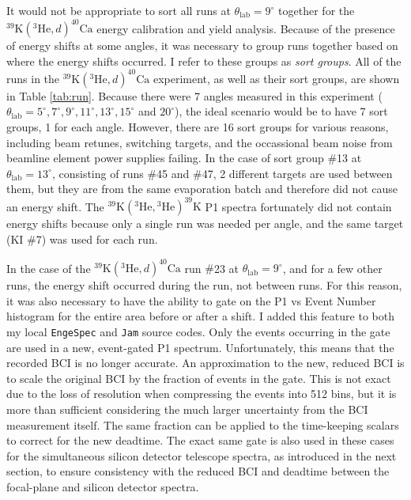 It would not be appropriate to sort all runs at $\theta_{\mathrm{lab}} = 9^{\circ}$ together for the $^{39}\mathrm{K}(^{3}\mathrm{He},d)^{40}\mathrm{Ca}$ energy calibration and yield analysis. Because of the presence of energy shifts at some angles, it was necessary to group runs together based on where the energy shifts occurred. I refer to these groups as \emph{sort groups}. All of the runs in the $^{39}\mathrm{K}(^{3}\mathrm{He},d)^{40}\mathrm{Ca}$ experiment, as well as their sort groups, are shown in Table \ref{tab:run}. Because there were 7 angles measured in this experiment ($\theta_{\mathrm{lab}} = 5^{\circ}, 7^{\circ}, 9^{\circ}, 11^{\circ}, 13^{\circ}, 15^{\circ}$ and $20^{\circ}$), the ideal scenario would be to have 7 sort groups, 1 for each angle. However, there are 16 sort groups for various reasons, including beam retunes, switching targets, and the occassional beam noise from beamline element power supplies failing. In the case of sort group $\#$13 at $\theta_{\mathrm{lab}} = 13^{\circ}$, consisting of runs $\#$45 and $\#$47, 2 different targets are used between them, but they are from the same evaporation batch and therefore did not cause an energy shift. The $^{39}\mathrm{K}(^{3}\mathrm{He}, {}^{3}\mathrm{He})^{39}\mathrm{K}$ P1 spectra fortunately did not contain energy shifts because only a single run was needed per angle, and the same target (KI $\#$7) was used for each run.

In the case of the $^{39}\mathrm{K}(^{3}\mathrm{He},d)^{40}\mathrm{Ca}$ run $\#$23 at $\theta_{\mathrm{lab}} = 9^{\circ}$, and for a few other runs, the energy shift occurred during the run, not between runs. For this reason, it was also necessary to have the ability to gate on the P1 vs Event Number histogram for the entire area before or after a shift. I added this feature to both my local \texttt{EngeSpec} and \texttt{Jam} source codes. Only the events occurring in the gate are used in a new, event-gated P1 spectrum. Unfortunately, this means that the recorded BCI is no longer accurate. An approximation to the new, reduced BCI is to scale the original BCI by the fraction of events in the gate. This is not exact due to the loss of resolution when compressing the events into 512 bins, but it is more than sufficient considering the much larger uncertainty from the BCI measurement itself. The same fraction can be applied to the time-keeping scalars to correct for the new deadtime. The exact same gate is also used in these cases for the simultaneous silicon detector telescope spectra, as introduced in the next section, to ensure consistency with the reduced BCI and deadtime between the focal-plane and silicon detector spectra.

